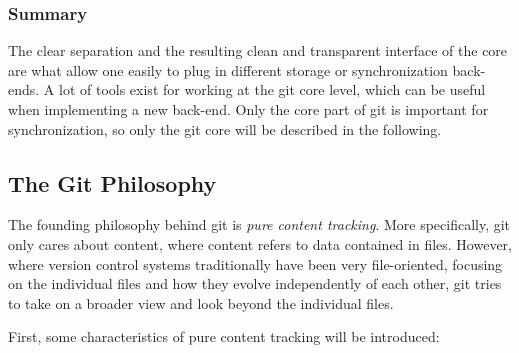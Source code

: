 \subsubsection*{Summary}

The clear separation and the resulting clean and transparent interface
of the core are what allow one easily to plug in different storage
or synchronization back-ends. A lot of tools exist for working at the
git core level, which can be useful when implementing a new back-end.
Only the core part of git is important for synchronization, so only
the git core will be described in the following.

\subsection{The Git Philosophy}


The founding philosophy behind git is \emph{pure content tracking}.
More specifically, git only cares about content, where content refers to
data contained in files. However, where version control systems
traditionally have been very file-oriented, focusing on the individual
files and how they evolve independently of each other, git tries to take
on a broader view and look beyond the individual files.

First, some characteristics of pure content tracking will be
introduced:

